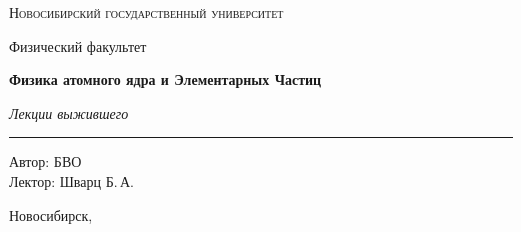 \documentclass[12pt,a4paper]{report}
\begin{document}
\hypersetup{pageanchor=false}
\begin{titlepage}
    \thispagestyle{empty}

    \begin{center}
        \vspace*{1.5cm}

        {\Large\scshape Новосибирский государственный университет\par}
        \vspace{0.25cm}
        {\large Физический факультет\par}

        \vfill

        {\Huge\bfseries Физика атомного ядра и Элементарных Частиц\par}

        \vspace{0.45cm}

        {\Large\itshape Лекции выжившего\par}

        \vspace{0.8cm}

        \rule{0.72\linewidth}{0 pt}





        \vfill

        \begin{flushright}
            \large
            Автор: БВО\\[0.25cm]
            Лектор: Шварц Б.\,А.
        \end{flushright}

        \vspace{1.2cm}

        {\large Новосибирск, \the\year}

    \end{center}
\end{titlepage}
\hypersetup{pageanchor=true}

\tableofcontents
\newpage



\clearpage
\end{document}
